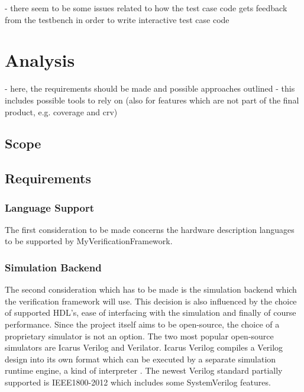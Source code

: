 \documentclass[12pt]{report}
\newcommand{\name}{MyVerificationFramework}
\begin{document}
- there seem to be some issues related to how the test case code gets feedback from the testbench in order to write
interactive test case code

\chapter{Analysis} %

- here, the requirements should be made and possible approaches outlined
- this includes possible tools to rely on (also for features which are not part of the final product, e.g. coverage and crv)

\section{Scope} %

\section{Requirements} %

\subsection{Language Support} %
The first consideration to be made concerns the hardware description languages to be supported by \name.

\subsection{Simulation Backend} %
The second consideration which has to be made is the simulation backend which the verification framework will use.
This decision is also influenced by the choice of supported HDL's, ease of interfacing with the simulation and
finally of course performance. Since the project itself aims to be open-source, the choice of a proprietary simulator
is not an option. The two most popular open-source simulators are Icarus Verilog and Verilator. Icarus Verilog
compiles a Verilog design into its own format which can be executed by a separate simulation runtime engine, a kind
of interpreter \cite{iverilog}. The newest Verilog standard partially supported is IEEE1800-2012 which includes some
SystemVerilog features.
\end{document}
